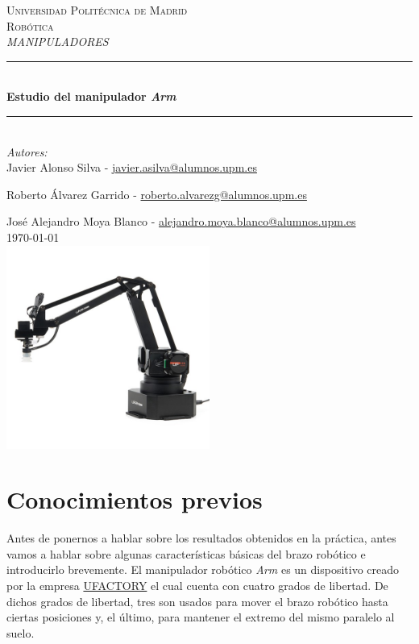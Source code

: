 \documentclass[a4paper,12pt]{article}
\begin{document}
\begin{titlepage}

    \newcommand{\HRule}{\rule{\linewidth}{0.5mm}}
    \center

    \textsc{\LARGE Universidad Politécnica de Madrid}\\[1cm]

    \textsc{\Large Robótica}\\[0.2cm]
    \textsc{\large \textit{MANIPULADORES}}\\[1cm]
    \HRule \\[0.8cm]
    { \huge \bfseries Estudio del manipulador \textit{{\textmu}Arm}}\\[0.7cm]
    \HRule \\[2cm]
    \large
    \emph{Autores:}\\
    Javier Alonso Silva - \href{mailto:javier.asilva@alumnos.upm.es}{javier.asilva@alumnos.upm.es}

    Roberto Álvarez Garrido - \href{mailto:roberto.alvarezg@alumnos.upm.es}{roberto.alvarezg@alumnos.upm.es}

    José Alejandro Moya Blanco - \href{mailto:alejandro.moya.blanco@alumnos.upm.es}{alejandro.moya.blanco@alumnos.upm.es}\\[1.5cm]
    {\large \today}\\[2cm]
    \includegraphics[width=0.5\textwidth]{images/uarm.jpg}\\[1cm]
\end{titlepage}

\section*{Conocimientos previos}

Antes de ponernos a hablar sobre los resultados obtenidos en la práctica,
antes vamos a hablar sobre algunas características básicas del brazo robótico e
introducirlo brevemente.
El manipulador robótico \emph{{\textmu}Arm} es un dispositivo creado por la empresa
\href{https://www.ufactory.cc/#/}{UFACTORY} el cual cuenta con cuatro grados de libertad.
De dichos grados de libertad, tres son usados para mover el brazo robótico hasta ciertas
posiciones y, el último, para mantener el extremo del mismo paralelo al suelo.
\end{document}
